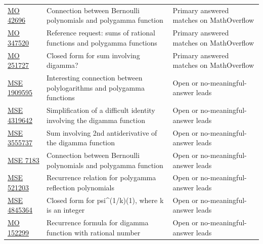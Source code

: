 \begin{longtable}{@{}p{}p{}p{}@{}}
\href{https://mathoverflow.net/questions/42696/connection-between-bernoulli-polynomials-and-polygamma-function}{MO 42696} & Connection between Bernoulli polynomials and polygamma function & Primary answered matches on MathOverflow\\
\href{https://mathoverflow.net/questions/347520/reference-request-sums-of-rational-functions-and-polygamma-functions}{MO 347520} & Reference request: sums of rational functions and polygamma functions & Primary answered matches on MathOverflow\\
\href{https://mathoverflow.net/questions/251727/closed-form-for-sum-involving-digamma}{MO 251727} & Closed form for sum involving digamma? & Primary answered matches on MathOverflow\\
\href{https://math.stackexchange.com/questions/1909595/interesting-connection-between-polylogarithms-and-polygamma-functions}{MSE 1909595} & Interesting connection between polylogarithms and polygamma functions & Open or no-meaningful-answer leads\\
\href{https://math.stackexchange.com/questions/4319642/simplification-of-a-difficult-identity-involving-the-digamma-function}{MSE 4319642} & Simplification of a difficult identity involving the digamma function & Open or no-meaningful-answer leads\\
\href{https://math.stackexchange.com/questions/3555737/sum-involving-2nd-antiderivative-of-the-digamma-function}{MSE 3555737} & Sum involving 2nd antiderivative of the digamma function & Open or no-meaningful-answer leads\\
\href{https://math.stackexchange.com/questions/7183/connection-between-bernoulli-polynomials-and-polygamma-function}{MSE 7183} & Connection between Bernoulli polynomials and polygamma function & Open or no-meaningful-answer leads\\
\href{https://math.stackexchange.com/questions/521203/recurrence-relation-for-polygamma-reflection-polynomials}{MSE 521203} & Recurrence relation for polygamma reflection polynomials & Open or no-meaningful-answer leads\\
\href{https://math.stackexchange.com/questions/4845364/closed-form-for-psi1-k1-where-k-is-an-integer}{MSE 4845364} & Closed form for psi\textasciicircum{}(1/k)(1), where k is an integer & Open or no-meaningful-answer leads\\
\href{https://mathoverflow.net/questions/152299/recurrence-formula-for-digamma-function-with-rational-number}{MO 152299} & Recurrence formula for digamma function with rational number & Open or no-meaningful-answer leads\\

\end{longtable}
